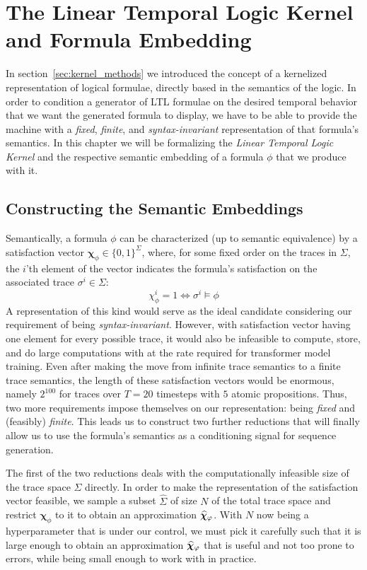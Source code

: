 \documentclass[titlepage,a4paper,11pt]{report}
\begin{document}
\chapter{The Linear Temporal Logic Kernel and Formula Embedding} \label{chap:kernel}
    In section~\ref{sec:kernel_methods} we introduced the concept of a kernelized representation of logical formulae, directly based in the semantics of the logic. In order to condition a  generator of LTL formulae on the desired temporal behavior that we want the generated formula to display, we have to be able to provide the machine with a \emph{fixed}, \emph{finite}, and \emph{syntax-invariant} representation of that formula's semantics. In this chapter we will be formalizing the \textit{Linear Temporal Logic Kernel} and the respective semantic embedding of a formula $\phi$ that we produce with it.

    \section{Constructing the Semantic Embeddings}
    Semantically, a formula $\phi$ can be characterized (up to semantic equivalence) by a satisfaction vector $\bm\chi_\phi \in \{0,1\}^\Sigma$, where, for some fixed order on the traces in $\Sigma$, the $i$'th element of the vector indicates the formula's satisfaction on the associated trace $\sigma^i \in \Sigma$:
    \begin{equation}
        \chi_\phi^i = 1 \iff \sigma^i \vDash \phi
    \end{equation}
    A representation of this kind would serve as the ideal candidate considering our requirement of being \emph{syntax-invariant}. However, with satisfaction vector having one element for every possible trace, it would also be infeasible to compute, store, and do large computations with at the rate required for transformer model training. Even after making the move from infinite trace semantics to a finite trace semantics, the length of these satisfaction vectors would be enormous, namely $2^{100}$ for traces over $T=20$ timesteps with $5$ atomic propositions. Thus, two more requirements impose themselves on our representation: being \emph{fixed} and (feasibly) \emph{finite}. This leads us to construct two further reductions that will finally allow us to use the formula's semantics as a conditioning signal for sequence generation.

    The first of the two reductions deals with the computationally infeasible size of the trace space $\Sigma$ directly. In order to make the representation of the satisfaction vector feasible, we sample a subset $\widehat \Sigma$ of size $N$ of the total trace space and restrict $\bm\chi_\phi$ to it to obtain an approximation $\bm{\widehat\chi}_\varphi$. With $N$ now being a hyperparameter that is under our control, we must pick it carefully such that it is large enough to obtain an approximation $\bm{\widehat\chi}_\varphi$ that is useful and not too prone to errors, while being small enough to work with in practice.
\end{document}
